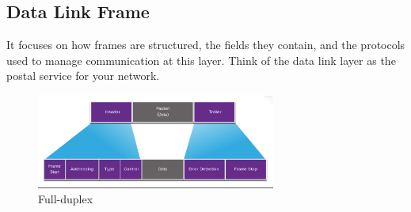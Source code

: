 \documentclass[a4paper,11pt]{article}
\begin{document}
\newpage
\subsection{Data Link Frame}
It focuses on how frames are structured, the fields they contain, and the protocols used to manage communication at this layer. Think of the data link layer as the postal service for your network.\\

\begin{figure}[h!]
\centering
\includegraphics[width=0.7\textwidth]{33.png}
\caption{Full-duplex}
\label{fig:cap1}
\end{figure}
\end{document}
